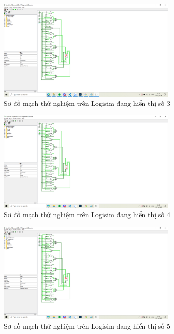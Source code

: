 \begin{figure}[H]
	\centering
	\includegraphics[width=0.8\textwidth]{images/3.PNG}
	\caption{Sơ đồ mạch thử nghiệm trên Logisim đang hiển thị số 3}
	\label{fig:circuitDesign}
\end{figure}

\begin{figure}[H]
	\centering
	\includegraphics[width=0.8\textwidth]{images/4.PNG}
	\caption{Sơ đồ mạch thử nghiệm trên Logisim đang hiển thị số 4}
	\label{fig:circuitDesign}
\end{figure}

\begin{figure}[H]
	\centering
	\includegraphics[width=0.8\textwidth]{images/5.PNG}
	\caption{Sơ đồ mạch thử nghiệm trên Logisim đang hiển thị số 5}
	\label{fig:circuitDesign}
\end{figure}

